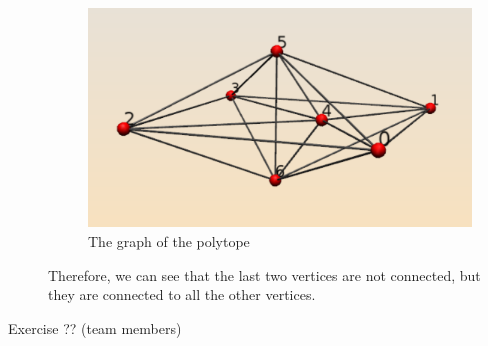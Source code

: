 \begin{description}
            \begin{figure}[!h]
            \centering \includegraphics[width=\textwidth]{alex-alvarez-exercise-graph}
            \caption{The graph of the polytope}
            \end{figure}
            Therefore, we can see that the last two vertices are not connected, but they are connected to all the other vertices.
\item[Exercise ?? (team members)] 
\end{description}



